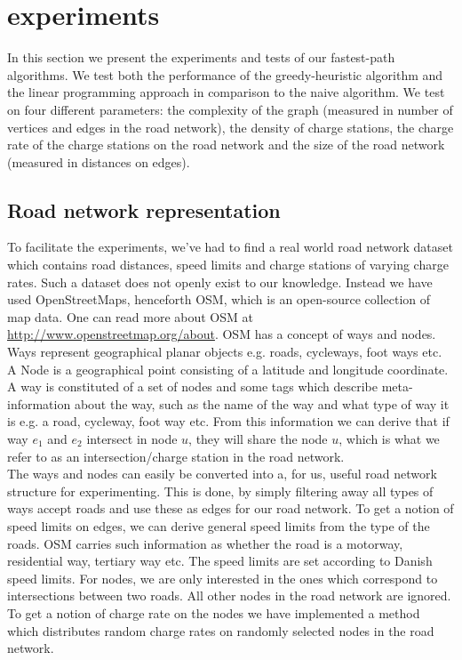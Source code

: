 \section{experiments}
\label{sec:experiments}
In this section we present the experiments and tests of our fastest-path algorithms. We test both the performance of the greedy-heuristic algorithm and the linear programming approach in comparison to the naive algorithm. We test on four different parameters: the complexity of the graph (measured in number of vertices and edges in the road network), the density of charge stations, the charge rate of the charge stations on the road network and the size of the road network (measured in distances on edges).

\subsection{Road network representation} 
\label{sub:setup}
To facilitate the experiments, we've had to find a real world road network dataset which contains road distances, speed limits and charge stations of varying charge rates. Such a dataset does not openly exist to our knowledge. Instead we have used OpenStreetMaps, henceforth OSM, which is an open-source collection of map data. One can read more about OSM at \url{http://www.openstreetmap.org/about}. OSM has a concept of ways and nodes. Ways represent geographical planar objects e.g. roads, cycleways, foot ways etc. A Node is a geographical point consisting of a latitude and longitude coordinate. A way is constituted of a set of nodes and some tags which describe meta-information about the way, such as the name of the way and what type of way it is e.g. a road, cycleway, foot way  etc. From this information we can derive that if way $e_1$ and $e_2$ intersect in node $u$, they will share the node $u$, which is what we refer to as an intersection/charge station in the road network.\\

The ways and nodes can easily be converted into a, for us, useful road network structure for experimenting. This is done, by simply filtering away all types of ways accept roads and use these as edges for our road network. To get a notion of speed limits on edges, we can derive general speed limits from the type of the roads. OSM carries such information as whether the road is a motorway, residential way, tertiary way etc. The speed limits are set according to Danish speed limits. For nodes, we are only interested in the ones which correspond to intersections between two roads. All other nodes in the road network are ignored. To get a notion of charge rate on the nodes we have implemented a method which distributes random charge rates on randomly selected nodes in the road network.

